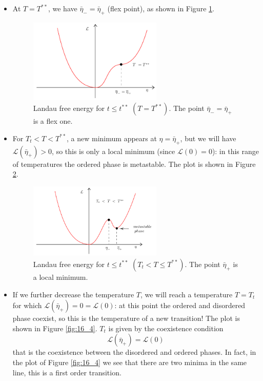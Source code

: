 \documentclass[../../Main/Main.tex]{subfiles}
\begin{document}
\begin{itemize}
  \begin{itemize}
  \item At \( T = T^{**}\), we have \( \bar{\eta }_- = \bar{\eta }_+   \) (flex point), as shown in Figure \ref{fig:16_2}.
  \begin{figure}[H]
  \centering
  \includegraphics[width=0.6\textwidth]{./img/2.pdf}
  \caption{\label{fig:16_2} Landau free energy for \( t\le t^{**} \) \( ( T = T^ {**}) \). The point \( \bar{\eta }_- =\bar{\eta }_+   \) is a flex one.}
  \end{figure}


  \item For \( T_t < T < T^{**} \), a new minimum appears at \( \eta = \bar{\eta }_+   \), but we will have \( \mathcal{L} (\bar{\eta }_+) >0  \), so  this is only a local minimum (since \( \mathcal{L}(0)=0 \)):  in this range of temperatures the ordered phase is metastable. The plot is shown in Figure  \ref{fig:16_3}.
  \begin{figure}[H]
  \centering
  \includegraphics[width=0.6\textwidth]{./img/3.pdf}
  \caption{\label{fig:16_3} Landau free energy for \( t\le t^{**} \) \( ( T_t <T \le T^ {**}) \). The point \( \bar{\eta }_+   \) is a local minimum.}
  \end{figure}


  \item If we further decrease the temperature \( T \), we will reach a temperature \( T=T_t \) for which \(\mathcal{L} (\bar{\eta }_+ ) = 0 = \mathcal{L}(0)  \):  at this point the ordered and disordered phase coexist, so this is the temperature of a new transition! The plot is shown in Figure  \ref{fig:16_4}. \( T_t \)  is given by the coexistence condition
  \begin{equation*}
    \mathcal{L} (\bar{\eta }_+ ) = \mathcal{L} (0)
  \end{equation*}
  that is the coexistence between the disordered and ordered phases. In fact, in the plot of Figure \ref{fig:16_4} we see that there are two minima in the same line, this is  a first order transition.


\end{itemize}
\end{itemize}
\end{document}
